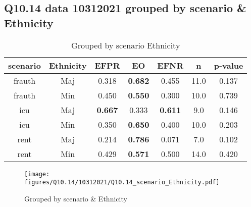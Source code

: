 \subsection{Q10.14 data 10312021 grouped by scenario \& Ethnicity}

\begin{comment}
                   EFPR        EO      EFNR     n    pvalue
(frauth, Maj)  0.318182  0.681818  0.454545  11.0  0.136759
(frauth, Min)  0.450000  0.550000  0.300000  10.0  0.738883
(icu, Maj)     0.666667  0.333333  0.611111   9.0  0.146350
(icu, Min)     0.350000  0.650000  0.400000  10.0  0.203056
(rent, Maj)    0.214286  0.785714  0.071429   7.0  0.102470
(rent, Min)    0.428571  0.571429  0.500000  14.0  0.420466
\end{comment}

\begin{table}[h]
    \centering
    \begin{tabular}{|c|c|c|c|c|c|c|}
        \hline
        scenario & Ethnicity & EFPR & EO & EFNR & n & p-value\\
        \hline
        frauth & Maj & 0.318 & \textbf{0.682} & 0.455 & 11.0 & 0.137\\
		frauth & Min & 0.450 & \textbf{0.550} & 0.300 & 10.0 & 0.739\\
		icu & Maj & \textbf{0.667} & 0.333 & \textbf{0.611} & 9.0 & 0.146\\
		icu & Min & 0.350 & \textbf{0.650} & 0.400 & 10.0 & 0.203\\
		rent & Maj & 0.214 & \textbf{0.786} & 0.071 & 7.0 & 0.102\\
		rent & Min & 0.429 & \textbf{0.571} & 0.500 & 14.0 & 0.420\\
		
        \hline
    \end{tabular}
    \caption{Grouped by scenario Ethnicity}
    \label{tab:my_label}
\end{table}
\begin{figure}[h]
    \centering
    \texttt{[image: figures/Q10.14/10312021/Q10.14\_scenario\_Ethnicity.pdf]}
    \caption{Grouped by scenario \& Ethnicity}
    \label{fig:my_label}
\end{figure}
